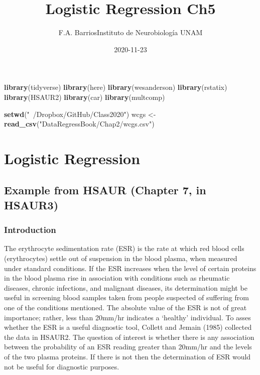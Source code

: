 \documentclass[
]{article}
\title{Logistic Regression Ch5}
\author{F.A. BarriosInstituto de Neurobiología UNAM}
\date{2020-11-23}
\newenvironment{Shaded}{\begin{snugshade}}{\end{snugshade}}
\newcommand{\KeywordTok}[1]{\textcolor[rgb]{0.13,0.29,0.53}{\textbf{#1}}}
\newcommand{\NormalTok}[1]{#1}
\newcommand{\StringTok}[1]{\textcolor[rgb]{0.31,0.60,0.02}{#1}}
\begin{document}
\maketitle

\begin{Shaded}
\begin{Highlighting}[]
\KeywordTok{library}\NormalTok{(tidyverse)}
\KeywordTok{library}\NormalTok{(here)}
\KeywordTok{library}\NormalTok{(wesanderson)}
\KeywordTok{library}\NormalTok{(rstatix)}
\KeywordTok{library}\NormalTok{(HSAUR2)}
\KeywordTok{library}\NormalTok{(car)}
\KeywordTok{library}\NormalTok{(multcomp)}

\KeywordTok{setwd}\NormalTok{(}\StringTok{"~/Dropbox/GitHub/Class2020"}\NormalTok{)}
\NormalTok{wcgs <-}\StringTok{ }\KeywordTok{read_csv}\NormalTok{(}\StringTok{"DataRegressBook/Chap2/wcgs.csv"}\NormalTok{)}
\end{Highlighting}
\end{Shaded}

\hypertarget{logistic-regression}{%
\section{Logistic Regression}\label{logistic-regression}}

\hypertarget{example-from-hsaur-chapter-7-in-hsaur3}{%
\subsection{Example from HSAUR (Chapter 7, in
HSAUR3)}\label{example-from-hsaur-chapter-7-in-hsaur3}}

\hypertarget{introduction}{%
\subsubsection{Introduction}\label{introduction}}

The erythrocyte sedimentation rate (ESR) is the rate at which red blood
cells (erythrocytes) settle out of suspension in the blood plasma, when
measured under standard conditions. If the ESR increases when the level
of certain proteins in the blood plasma rise in association with
conditions such as rheumatic diseases, chronic infections, and malignant
diseases, its determination might be useful in screening blood samples
taken from people suspected of suffering from one of the conditions
mentioned. The absolute value of the ESR is not of great importance;
rather, less than 20mm/hr indicates a `healthy' individual. To asses
whether the ESR is a useful diagnostic tool, Collett and Jemain (1985)
collected the data in HSAUR2. The question of interest is whether there
is any association between the probability of an ESR reading greater
than 20mm/hr and the levels of the two plasma proteins. If there is not
then the determination of ESR would not be useful for diagnostic
purposes.
\end{document}
